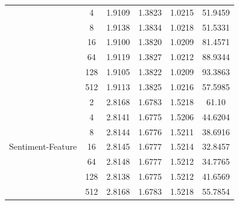 \documentclass[sigconf,authorversion,nonacm]{acmart}
\begin{document}
\begin{table}
\begin{tabular}{@{}cccccc@{}}
                 & 4 & 1.9109 & 1.3823 & 1.0215 & 51.9459 \\
                 & 8 & 1.9138 & 1.3834 & 1.0218 & 51.5331 \\
                 & 16 & 1.9100 & 1.3820 & 1.0209 & 81.4571 \\
                 & 64 & 1.9119 & 1.3827 & 1.0212 & 88.9344 \\
                 & 128 & 1.9105 & 1.3822 & 1.0209 & 93.3863 \\
                 & 512 & 1.9113 & 1.3825 & 1.0216 & 57.5985 \\\midrule
        \multirow{7}{*}{Sentiment-Feature} & 2 & 2.8168 & 1.6783 & 1.5218 & 61.10 \\
                 & 4 & 2.8141 & 1.6775 & 1.5206 & 44.6204 \\
                 & 8 & 2.8144 & 1.6776 & 1.5211 & 38.6916 \\
                 & 16 & 2.8145 & 1.6777 & 1.5214 & 32.8457 \\
                 & 64 & 2.8148 & 1.6777 & 1.5212 & 34.7765 \\
                 & 128 & 2.8138 & 1.6775 & 1.5212 & 41.6569 \\
                 & 512 & 2.8168 & 1.6783 & 1.5218 & 55.7854 \\
        \bottomrule
        \end{tabular}
    \end{table}
\end{document}
